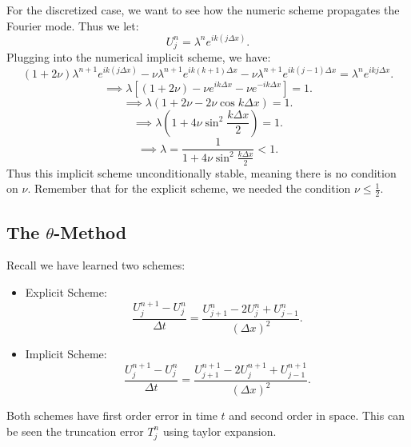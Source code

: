 \documentclass[../main/main.tex]{subfiles}
\begin{document}
For the discretized case, we want to see how the numeric scheme propagates the Fourier mode. Thus we let: \[
    U^n_j = \lambda^n e^{ik(j\Delta x)}
.\] Plugging into the numerical implicit scheme, we have: \[
(1+2\nu)\lambda^{n+1}e^{ik(j\Delta x)} - \nu \lambda^{n+1} e^{ik(k+1)\Delta x} - \nu \lambda^{n+1}e^{ik(j-1)\Delta x} = \lambda^{n} e^{ikj\Delta x}
.\] \[
\implies \lambda \left[(1+2\nu) -\nu e^{ik\Delta x} - \nu e^{-ik\Delta x}\right] = 1
.\] \[
\implies \lambda \left( 1+2\nu -2\nu \cos k\Delta x \right)  = 1
.\] \[
\implies \lambda \left( 1+4\nu \sin^2 \frac{k\Delta x}{2} \right)  = 1
.\] \[
 \implies \lambda = \frac{1}{1+4\nu \sin^2 \frac{k\Delta x}{2}}<1
.\] Thus this implicit scheme unconditionally stable, meaning there is no condition on $\nu$. Remember that for the explicit scheme, we needed the condition $\nu \le  \frac{1}{2}$.

\subsection{The $\theta$-Method}
Recall we have learned two schemes: 
\begin{itemize}
    \item Explicit Scheme: \[ 
        \frac{U^{n+1}_j-U^n_j}{\Delta t} =  \frac{U^{n}_{j+1}-2U^n_j+U^n_{j-1}}{(\Delta x)^2} 
    .\] 
\item Implicit Scheme: \[ 
        \frac{U^{n+1}_j-U^n_j}{\Delta t} = \frac{U^{n+1}_{j+1} - 2U^{n+1}_j + U^{n+1}_{j-1}}{(\Delta x)^2}
.\] 
\end{itemize}
Both schemes have first order error in time $t$ and second order in space. This can be seen the truncation error $T^n_j$ using taylor expansion.
\end{document}
